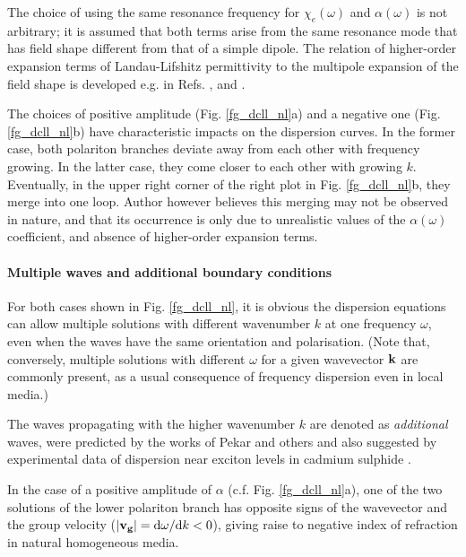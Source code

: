 The choice of using the same resonance frequency for $\chi_e(\omega)$ and $\alpha(\omega)$ is not arbitrary; it is assumed that both terms arise from the same resonance mode that has field shape different from that of a simple dipole. The relation of higher-order expansion terms of Landau-Lifshitz permittivity  to the multipole expansion of the field shape is developed e.g. in Refs. \cite{agranovich2006spatial}, \cite{vinogradov2002form} and \cite{fietz2011homogenization}.

The choices of positive amplitude (Fig. \ref{fg_dcll_nl}a) and a negative one (Fig. \ref{fg_dcll_nl}b) have characteristic impacts on the dispersion curves. In the former case, both polariton branches deviate away from each other with frequency growing. In the latter case, they come closer to each other with growing $k$. Eventually, in the upper right corner of the right plot in Fig. \ref{fg_dcll_nl}b, they merge into one loop. Author however believes this merging may not be observed in nature, and that its occurrence is only due to unrealistic values of the $\alpha(\omega)$ coefficient, and absence of higher-order expansion terms.

\paragraph{Multiple waves and additional boundary conditions}   %
For both cases shown in Fig. \ref{fg_dcll_nl}, it is obvious the dispersion equations can allow multiple solutions with different wavenumber $k$ at one frequency $\omega$, even when the waves have the same orientation and polarisation. (Note that, conversely, multiple solutions with different $\omega$ for a given wavevector ${\mathbf{k}}$ are commonly present, as a usual consequence of frequency dispersion even in local media.)

The waves propagating with the higher wavenumber $k$ are denoted as \textit{additional} waves, were predicted by the works of Pekar and others
and also suggested by experimental data of dispersion near exciton levels in cadmium sulphide
\cite{pekar1975spatial}. 

In the case of a positive amplitude of $\alpha$ (c.f. Fig. \ref{fg_dcll_nl}a), one of the two solutions of the lower polariton branch has opposite signs of the wavevector and the group velocity ($|{\mathbf{v_g}}| = \mathrm{d}\omega/\mathrm{d}k < 0$), giving raise to negative index of refraction in natural homogeneous media.

